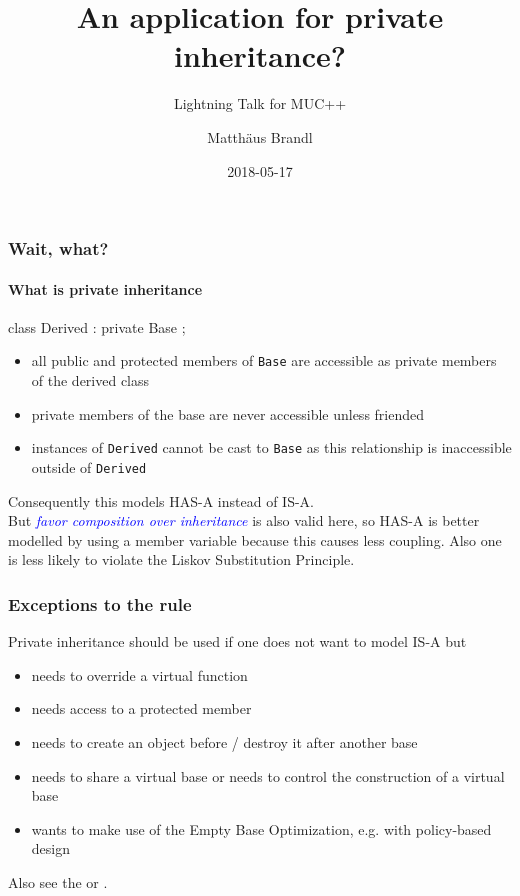 \documentclass{beamer}
\title{An application for private inheritance?}
\subtitle{Lightning Talk for MUC++}
\author{Matth\"aus Brandl}
\date{2018-05-17}
\def\code#1{\texttt{#1}}
\def\cite#1{\textit{\textcolor{blue}{#1}}}
\begin{document}

\frame{\titlepage}


\begin{frame}[fragile]
\frametitle{Wait, what?}
\framesubtitle{What is private inheritance}

\begin{C++}
class Derived : private Base
{};
\end{C++}

\begin{itemize}
\item all public and protected members of \code{Base} are accessible as private members of the derived class
\item private members of the base are never accessible unless friended
\item instances of \code{Derived} cannot be cast to \code{Base} as this relationship is inaccessible outside of \code{Derived}
\end{itemize}

Consequently this models HAS-A instead of IS-A.\\
But \cite{favor composition over inheritance} is also valid here, so HAS-A is better modelled by using a member variable because this causes less coupling. Also one is less likely to violate the Liskov Substitution Principle.
\end{frame}


\begin{frame}[fragile]
\frametitle{Exceptions to the rule}
Private inheritance should be used if one does not want to model IS-A but
\begin{itemize}
\item needs to override a virtual function
\item needs access to a protected member
\item needs to create an object before / destroy it after another base
\item needs to share a virtual base or needs to control the construction of a virtual base
\item wants to make use of the Empty Base Optimization, e.g. with policy-based design
\end{itemize}

Also see the \href{https://isocpp.org/wiki/faq/private-inheritance}{} or \href{https://en.cppreference.com/w/cpp/language/derived_class%23Private_inheritance}{\beamergotobutton{cppreference.com}}.
\end{frame}
\end{document}
